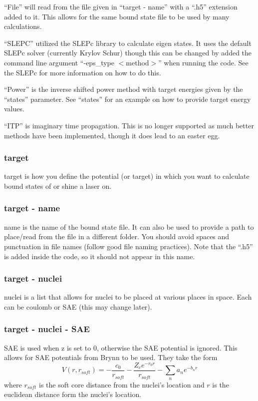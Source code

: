 \documentclass{article}
\begin{document}
``File'' will read from the file given in ``target - name'' with a ``.h5'' extension added to it. This allows for the same bound state file to be used by many calculations.

``SLEPC'' utilized the SLEPc library to calculate eigen states. It uses the default SLEPc solver (currently Krylov Schur) though this can be changed by added the command line argument ``-eps\_type $<$method$>$'' when running the code. See the SLEPc for more information on how to do this.

``Power'' is the inverse shifted power method with target energies given by the ``states'' parameter. See ``states'' for an example on how to provide target energy values.

``ITP'' is imaginary time propagation. This is no longer supported as much better methods have been implemented, though it does lead to an easter egg.

\subsubsection{target}
target is how you define the potential (or target) in which you want to calculate bound states of or shine a laser on.

\subsubsection{target - name}
name is the name of the bound state file. It can also be used to provide a path to place/read from the file in a different folder. You should avoid spaces and punctuation in file names (follow good file naming practices). Note that the ``.h5'' is added inside the code, so it should not appear in this name.

\subsubsection{target - nuclei}
nuclei is a list that allows for nuclei to be placed at various places in space. Each can be coulomb or SAE (this may change later).


\subsubsection{target - nuclei - SAE}
SAE is used when z is set to 0, otherwise the SAE potential is ignored. This allows for SAE potentials from Brynn to be used. They take the form
\begin{equation}
  V(r, r_{soft}) = - \frac{c_0}{r_{soft}} - \frac{Z_c e^{-r_0 r}}{r_{soft}} - \sum_n a_n e^{-b_n r}
    \label{eq:SAE_target}
\end{equation}
where $r_{soft}$ is the soft core distance from the nuclei's location and $r$ is the euclidean distance form the nuclei's location.
\end{document}
